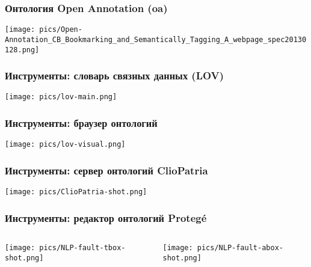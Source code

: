 \documentclass[10pt]{beamer}
\begin{document}
\begin{frame}[fragile]
  \frametitle{Онтология Open Annotation (oa)}
  \begin{center}
    \texttt{[image: pics/Open-Annotation\_CB\_Bookmarking\_and\_Semantically\_Tagging\_A\_webpage\_spec20130128.png]}
  \end{center}
\end{frame}

\begin{frame}[fragile]
  \frametitle{Инструменты: словарь связных данных (LOV)}
  \begin{center}
    \texttt{[image: pics/lov-main.png]}
  \end{center}
\end{frame}

\begin{frame}[fragile]
  \frametitle{Инструменты: браузер онтологий}
  \begin{center}
    \texttt{[image: pics/lov-visual.png]}
  \end{center}
\end{frame}

\begin{frame}[fragile]
  \frametitle{Инструменты: сервер онтологий ClioPatria}
  \begin{center}
    \texttt{[image: pics/ClioPatria-shot.png]}
  \end{center}
\end{frame}

\begin{frame}[fragile]
  \frametitle{Инструменты: редактор онтологий Proteg\'e}
  \begin{columns}
    \begin{column}{0.4\textwidth}
      \texttt{[image: pics/NLP-fault-tbox-shot.png]}
    \end{column}
    \begin{column}{0.6\textwidth}
      \texttt{[image: pics/NLP-fault-abox-shot.png]}
    \end{column}
  \end{columns}
\end{frame}
\end{document}
